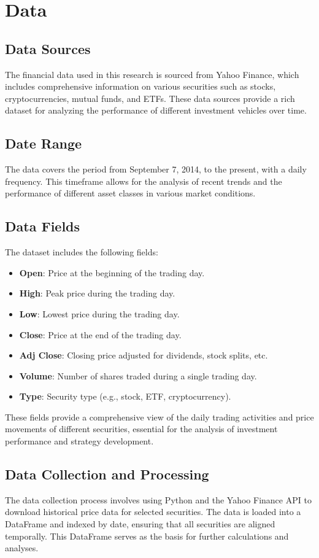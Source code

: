 \section{Data}
\subsection{Data Sources}
The financial data used in this research is sourced from Yahoo Finance, which includes comprehensive information on various securities such as stocks, cryptocurrencies, mutual funds, and ETFs. These data sources provide a rich dataset for analyzing the performance of different investment vehicles over time.

\subsection{Date Range}
The data covers the period from September 7, 2014, to the present, with a daily frequency. This timeframe allows for the analysis of recent trends and the performance of different asset classes in various market conditions.

\subsection{Data Fields}
The dataset includes the following fields:
\begin{itemize}
    \item \textbf{Open}: Price at the beginning of the trading day.
    \item \textbf{High}: Peak price during the trading day.
    \item \textbf{Low}: Lowest price during the trading day.
    \item \textbf{Close}: Price at the end of the trading day.
    \item \textbf{Adj Close}: Closing price adjusted for dividends, stock splits, etc.
    \item \textbf{Volume}: Number of shares traded during a single trading day.
    \item \textbf{Type}: Security type (e.g., stock, ETF, cryptocurrency).
\end{itemize}

These fields provide a comprehensive view of the daily trading activities and price movements of different securities, essential for the analysis of investment performance and strategy development.

\subsection{Data Collection and Processing}
The data collection process involves using Python and the Yahoo Finance API to download historical price data for selected securities. The data is loaded into a DataFrame and indexed by date, ensuring that all securities are aligned temporally. This DataFrame serves as the basis for further calculations and analyses.

